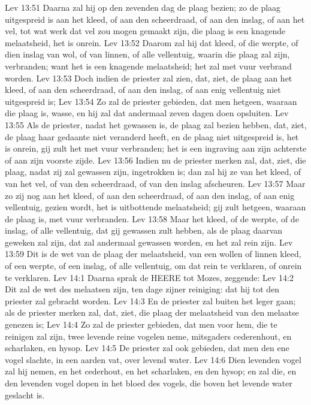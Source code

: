 Lev 13:51  Daarna zal hij op den zevenden dag de plaag bezien; zo de plaag uitgespreid is aan het kleed, of aan den scheerdraad, of aan den inslag, of aan het vel, tot wat werk dat vel zou mogen gemaakt zijn, die plaag is een knagende melaatsheid, het is onrein.
Lev 13:52  Daarom zal hij dat kleed, of die werpte, of dien inslag van wol, of van linnen, of alle vellentuig, waarin die plaag zal zijn, verbranden; want het is een knagende melaatsheid; het zal met vuur verbrand worden.
Lev 13:53  Doch indien de priester zal zien, dat, ziet, de plaag aan het kleed, of aan den scheerdraad, of aan den inslag, of aan enig vellentuig niet uitgespreid is;
Lev 13:54  Zo zal de priester gebieden, dat men hetgeen, waaraan die plaag is, wasse, en hij zal dat andermaal zeven dagen doen opsluiten.
Lev 13:55  Als de priester, nadat het gewassen is, de plaag zal bezien hebben, dat, ziet, de plaag haar gedaante niet veranderd heeft, en de plaag niet uitgespreid is, het is onrein, gij zult het met vuur verbranden; het is een ingraving aan zijn achterste of aan zijn voorste zijde.
Lev 13:56  Indien nu de priester merken zal, dat, ziet, die plaag, nadat zij zal gewassen zijn, ingetrokken is; dan zal hij ze van het kleed, of van het vel, of van den scheerdraad, of van den inslag afscheuren.
Lev 13:57  Maar zo zij nog aan het kleed, of aan den scheerdraad, of aan den inslag, of aan enig vellentuig, gezien wordt, het is uitbottende melaatsheid; gij zult hetgeen, waaraan de plaag is, met vuur verbranden.
Lev 13:58  Maar het kleed, of de werpte, of de inslag, of alle vellentuig, dat gij gewassen zult hebben, als de plaag daarvan geweken zal zijn, dat zal andermaal gewassen worden, en het zal rein zijn.
Lev 13:59  Dit is de wet van de plaag der melaatsheid, van een wollen of linnen kleed, of een werpte, of een inslag, of alle vellentuig, om dat rein te verklaren, of onrein te verklaren.
Lev 14:1  Daarna sprak de HEERE tot Mozes, zeggende:
Lev 14:2  Dit zal de wet des melaatsen zijn, ten dage zijner reiniging: dat hij tot den priester zal gebracht worden.
Lev 14:3  En de priester zal buiten het leger gaan; als de priester merken zal, dat, ziet, die plaag der melaatsheid van den melaatse genezen is;
Lev 14:4  Zo zal de priester gebieden, dat men voor hem, die te reinigen zal zijn, twee levende reine vogelen neme, mitsgaders cederenhout, en scharlaken, en hysop.
Lev 14:5  De priester zal ook gebieden, dat men den ene vogel slachte, in een aarden vat, over levend water.
Lev 14:6  Dien levenden vogel zal hij nemen, en het cederhout, en het scharlaken, en den hysop; en zal die, en den levenden vogel dopen in het bloed des vogels, die boven het levende water geslacht is.

